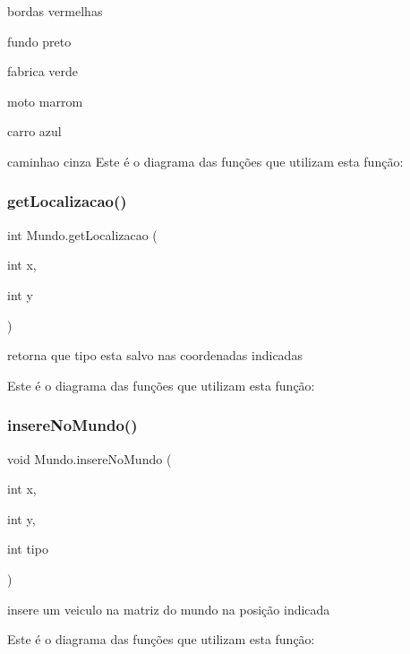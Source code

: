 bordas vermelhas

fundo preto

fabrica verde

moto marrom

carro azul

caminhao cinza Este é o diagrama das funções que utilizam esta função\+:
\mbox{\label{class_mundo_ac971ab63c34c7ab0c00df63277589338}} 
\subsubsection{\texorpdfstring{get\+Localizacao()}{getLocalizacao()}}
{\footnotesize\ttfamily int Mundo.\+get\+Localizacao (\begin{DoxyParamCaption}\item[{int}]{x,  }\item[{int}]{y }\end{DoxyParamCaption})}



retorna que tipo esta salvo nas coordenadas indicadas 

Este é o diagrama das funções que utilizam esta função\+:
\mbox{\label{class_mundo_afec47a52ae6772f201f120fc62ba4546}} 
\subsubsection{\texorpdfstring{insere\+No\+Mundo()}{insereNoMundo()}}
{\footnotesize\ttfamily void Mundo.\+insere\+No\+Mundo (\begin{DoxyParamCaption}\item[{int}]{x,  }\item[{int}]{y,  }\item[{int}]{tipo }\end{DoxyParamCaption})}



insere um veiculo na matriz do mundo na posição indicada 

Este é o diagrama das funções que utilizam esta função\+:
\mbox{\label{class_mundo_a871bfb3ebd38d8ce498777bb0dd1cdeb}} 
